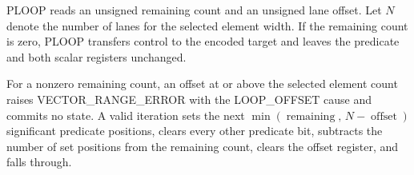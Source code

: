 PLOOP reads an unsigned remaining count and an unsigned lane offset. Let $N$
denote the number of lanes for the selected element width. If the remaining
count is zero, PLOOP transfers control to the encoded target and leaves the
predicate and both scalar registers unchanged.

For a nonzero remaining count, an offset at or above the selected element count
raises VECTOR\_RANGE\_ERROR with the LOOP\_OFFSET cause and commits no state. A
valid iteration sets the next
$\min(\operatorname{remaining},\,N-\operatorname{offset})$ significant
predicate positions,
clears every other predicate bit, subtracts the number of set positions from
the remaining count, clears the offset register, and falls through.
